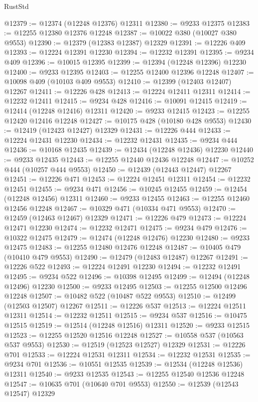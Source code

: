 \begin{lexlean}{RustStd}
\begin{coremodule}
@12379 := @12374 (@12248 @12376) @12311
@12380 := @9233 @12375
@12383 := @12255 @12380 @12376 @12248
@12387 := @10022 @380 (@10027 @380 @9553)
@12390 := @12379 (@12383 @12387) @12329
@12391 := @12226 @409
@12393 := @12224 @12391 @12230
@12394 := @12232 @12391
@12395 := @9234 @409
@12396 := @10015 @12395
@12399 := @12394 (@12248 @12396) @12230
@12400 := @9233 @12395
@12403 := @12255 @12400 @12396 @12248
@12407 := @10098 @409 (@10103 @409 @9553)
@12410 := @12399 (@12403 @12407) @12267
@12411 := @12226 @428
@12413 := @12224 @12411 @12311
@12414 := @12232 @12411
@12415 := @9234 @428
@12416 := @10091 @12415
@12419 := @12414 (@12248 @12416) @12311
@12420 := @9233 @12415
@12423 := @12255 @12420 @12416 @12248
@12427 := @10175 @428 (@10180 @428 @9553)
@12430 := @12419 (@12423 @12427) @12329
@12431 := @12226 @444
@12433 := @12224 @12431 @12230
@12434 := @12232 @12431
@12435 := @9234 @444
@12436 := @10168 @12435
@12439 := @12434 (@12248 @12436) @12230
@12440 := @9233 @12435
@12443 := @12255 @12440 @12436 @12248
@12447 := @10252 @444 (@10257 @444 @9553)
@12450 := @12439 (@12443 @12447) @12267
@12451 := @12226 @471
@12453 := @12224 @12451 @12311
@12454 := @12232 @12451
@12455 := @9234 @471
@12456 := @10245 @12455
@12459 := @12454 (@12248 @12456) @12311
@12460 := @9233 @12455
@12463 := @12255 @12460 @12456 @12248
@12467 := @10329 @471 (@10334 @471 @9553)
@12470 := @12459 (@12463 @12467) @12329
@12471 := @12226 @479
@12473 := @12224 @12471 @12230
@12474 := @12232 @12471
@12475 := @9234 @479
@12476 := @10322 @12475
@12479 := @12474 (@12248 @12476) @12230
@12480 := @9233 @12475
@12483 := @12255 @12480 @12476 @12248
@12487 := @10405 @479 (@10410 @479 @9553)
@12490 := @12479 (@12483 @12487) @12267
@12491 := @12226 @522
@12493 := @12224 @12491 @12230
@12494 := @12232 @12491
@12495 := @9234 @522
@12496 := @10398 @12495
@12499 := @12494 (@12248 @12496) @12230
@12500 := @9233 @12495
@12503 := @12255 @12500 @12496 @12248
@12507 := @10482 @522 (@10487 @522 @9553)
@12510 := @12499 (@12503 @12507) @12267
@12511 := @12226 @537
@12513 := @12224 @12511 @12311
@12514 := @12232 @12511
@12515 := @9234 @537
@12516 := @10475 @12515
@12519 := @12514 (@12248 @12516) @12311
@12520 := @9233 @12515
@12523 := @12255 @12520 @12516 @12248
@12527 := @10558 @537 (@10563 @537 @9553)
@12530 := @12519 (@12523 @12527) @12329
@12531 := @12226 @701
@12533 := @12224 @12531 @12311
@12534 := @12232 @12531
@12535 := @9234 @701
@12536 := @10551 @12535
@12539 := @12534 (@12248 @12536) @12311
@12540 := @9233 @12535
@12543 := @12255 @12540 @12536 @12248
@12547 := @10635 @701 (@10640 @701 @9553)
@12550 := @12539 (@12543 @12547) @12329

\end{coremodule}
\end{lexlean}
